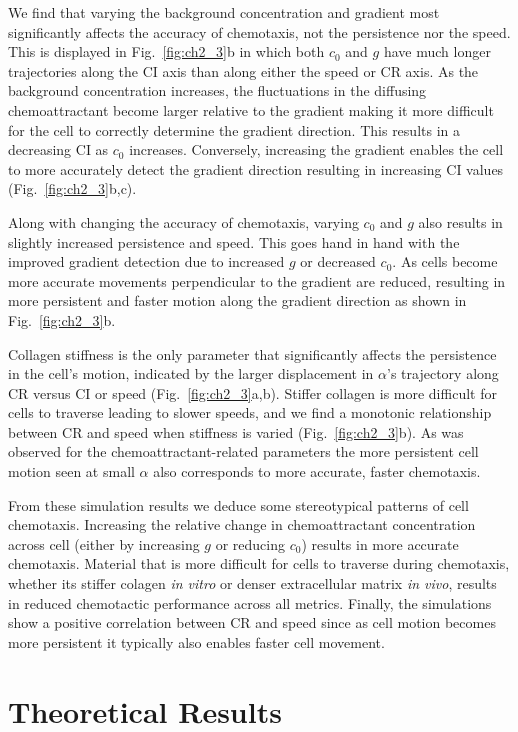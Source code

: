 We find that varying the background concentration and gradient most significantly affects the accuracy of chemotaxis, not the persistence nor the speed. This is displayed in Fig.\ \ref{fig:ch2_3}b in which both $c_0$ and $g$ have much longer trajectories along the CI axis than along either the speed or CR axis.
As the background concentration increases, the fluctuations in the diffusing chemoattractant become larger relative to the gradient making it more difficult for the cell to correctly determine the gradient direction. This results in a decreasing CI as $c_0$ increases. Conversely, increasing the gradient enables the cell to more accurately detect the gradient direction resulting in increasing CI values (Fig.\ \ref{fig:ch2_3}b,c).

Along with changing the accuracy of chemotaxis, varying $c_0$ and $g$ also results in slightly increased persistence and speed. This goes hand in hand with the improved gradient detection due to increased $g$ or decreased $c_0$. As cells become more accurate movements perpendicular to the gradient are reduced, resulting in more persistent and faster motion along the gradient direction as shown in Fig.\ \ref{fig:ch2_3}b.

Collagen stiffness is the only parameter that significantly affects the persistence in the cell's motion, indicated by the larger displacement in $\alpha$'s trajectory along CR versus CI or speed (Fig.\ \ref{fig:ch2_3}a,b). Stiffer collagen is more difficult for cells to traverse leading to slower speeds, and we find a monotonic relationship between CR and speed when stiffness is varied (Fig.\ \ref{fig:ch2_3}b). As was observed for the chemoattractant-related parameters the more persistent cell motion seen at small $\alpha$ also corresponds to more accurate, faster chemotaxis.

From these simulation results we deduce some stereotypical patterns of cell chemotaxis. Increasing the relative change in chemoattractant concentration across cell (either by increasing $g$ or reducing $c_0$) results in more accurate chemotaxis. Material that is more difficult for cells to traverse during chemotaxis, whether its stiffer colagen \textit{in vitro} or denser extracellular matrix \textit{in vivo}, results in reduced chemotactic performance across all metrics. Finally, the simulations show a positive correlation between CR and speed since as cell motion becomes more persistent it typically also enables faster cell movement.

\section{Theoretical Results}

